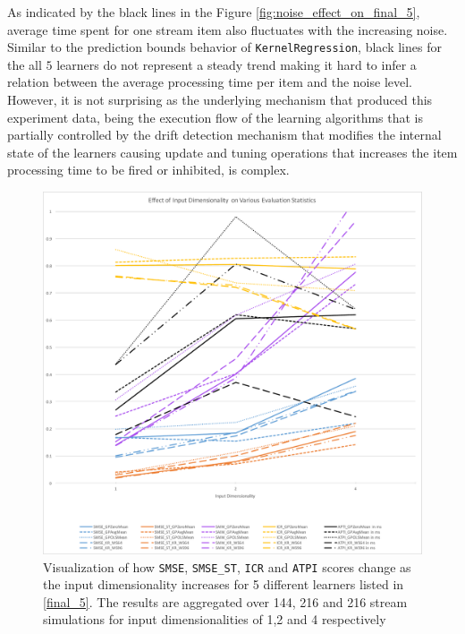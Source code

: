 As indicated by the black lines in the Figure \ref{fig:noise_effect_on_final_5}, average time spent for one stream item also fluctuates with the increasing noise. Similar to the prediction bounds behavior of \texttt{KernelRegression}, black lines for the all $5$ learners do not represent a steady trend making it hard to infer a relation between the average processing time per item and the noise level. However, it is not surprising as the underlying mechanism that produced this experiment data, being the execution flow of the learning algorithms that is partially controlled by the drift detection mechanism that modifies the internal state of the learners causing update and tuning operations that increases the item processing time to be fired or inhibited, is complex. 

\begin{figure}[htbp]
  \centering
    \includegraphics[width=\linewidth]{./Figures/inpdim_effect_on_final_5.pdf}
  \caption{Visualization of how \texttt{SMSE}, \texttt{SMSE\_ST}, \texttt{ICR} and \texttt{ATPI} scores change as the input dimensionality increases for 5 different learners listed in \ref{final_5}. The results are aggregated over 144, 216 and 216 stream simulations for input dimensionalities of 1,2 and 4 respectively}
  \label{fig:inpdim_effect_on_final_5}
\end{figure}

